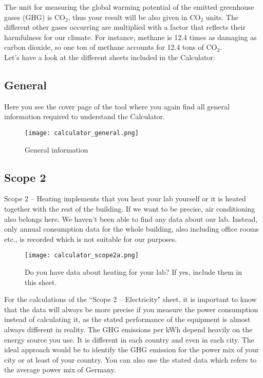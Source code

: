 The unit for measuring the global warming potential of the emitted greenhouse gases (GHG) is CO$_2$, thus your result will be also given in CO$_2$ units. The different other gases occurring are multiplied with a factor that reflects their harmfulness for our climate. For instance, methane is 12.4 times as damaging as carbon dioxide, so one ton of methane accounts for 12.4 tons of CO$_2$. \\
Let’s have a look at the different sheets included in the Calculator:

\subsection{General}

Here you see the cover page of the tool where you again find all general information required to understand the Calculator. 

\begin{figure}[h!]
	\label{fig:general}
	\centering
	\texttt{[image: calculator\_general.png]}%
	\caption{General information}%
\end{figure}

\clearpage
\subsection{Scope 2}

Scope 2 – Heating implements that you heat your lab yourself or it is heated together with the rest of the building. If we want to be precise, air conditioning also belongs here. We haven’t been able to find any data about our lab. Instead, only annual consumption data for the whole building, also including office rooms etc., is recorded which is not suitable for our purposes.

\begin{figure}[h!]
	\centering
	\texttt{[image: calculator\_scope2a.png]}%
	\caption{Do you have data about heating for your lab? If yes, include them in this sheet.}%
\end{figure}


For the calculations of the “Scope 2 – Electricity" sheet, it is important to know that the data will always be more precise if you measure the power consumption instead of calculating it, as the stated performance of the equipment is almost always different in reality. The GHG emissions per kWh depend heavily on the energy source you use. It is different in each country and even in each city. The ideal approach would be to identify the GHG emission for the power mix of your city or at least of your country. You can also use the stated data which refers to the average power mix of Germany.

